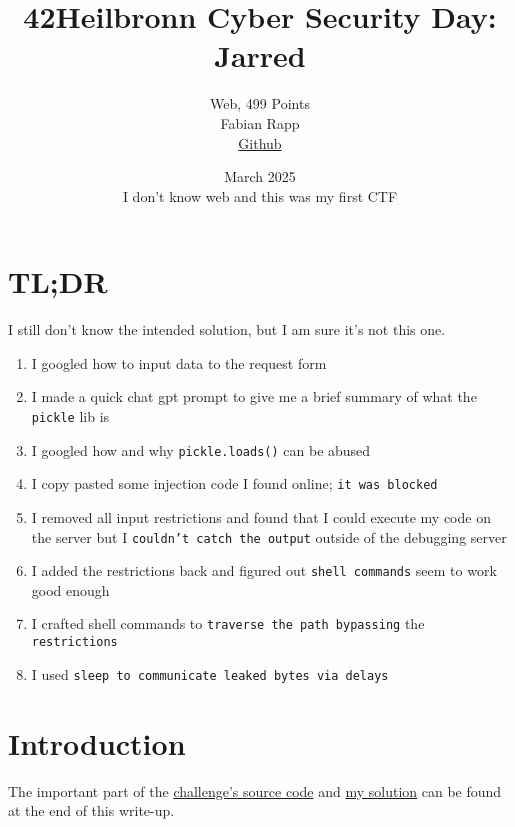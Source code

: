 \documentclass{article}
\title{42Heilbronn Cyber Security Day: Jarred}
\author{Web, 499 Points \\ Fabian Rapp \\ \href{https://github.com/FabianRapp/CTF_web_jarred}{Github}}
\date{March 2025\\I don't know web and this was my first CTF}
\begin{document}
\maketitle
\tableofcontents

\section{TL;DR}
I still don't know the intended solution, but I am sure it's not this one.
\begin{enumerate}
    \item I googled how to input data to the request form
    \item I made a quick chat gpt prompt to give me a brief summary of what the \texttt{pickle} lib is
    \item I googled how and why \texttt{pickle.loads()} can be abused
    \item I copy pasted some injection code I found online; \texttt{it was blocked}
    \item I removed all input restrictions and found that I could execute my code on the server but I \texttt{couldn't catch the output} outside of the debugging server
    \item I added the restrictions back and figured out \texttt{shell commands} seem to work good enough
    \item I crafted shell commands to \texttt{traverse the path bypassing}
    the \texttt{restrictions}
    \item I used \texttt{sleep to communicate leaked bytes via delays}
\end{enumerate}


\section{Introduction} 
The important part of the \hyperref[sec:chall_sourcecode]{challenge's source code} and \hyperref[sec:sourcecode]{my solution} can be found at the end of this write-up.
\end{document}
